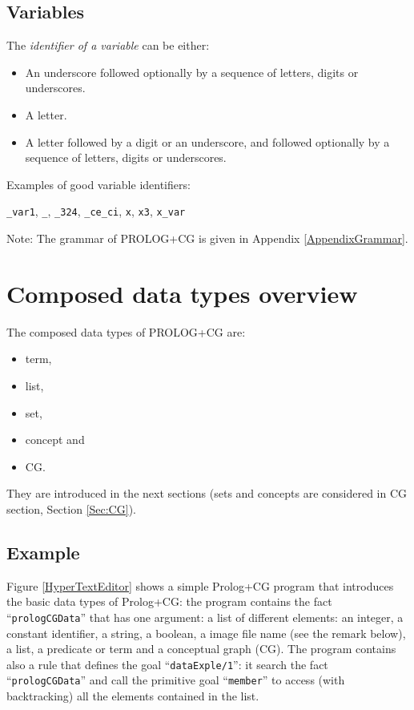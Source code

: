\documentclass{book}
\begin{document}
\subsection{Variables}

The {\it identifier of a variable} can be either:

\begin{itemize}
  \item An underscore followed optionally by a
sequence of letters, digits or underscores.
  \item A letter.
  \item A letter followed by a digit or an
underscore, and followed optionally by a sequence of letters,
digits or underscores.
\end{itemize}

Examples of good variable identifiers:

\texttt{\_var1}, \texttt{\_}, \texttt{\_324}, \texttt{\_ce\_ci},
\texttt{x}, \texttt{x3}, \texttt{x\_var}

Note: The grammar of PROLOG+CG is given in Appendix
\ref{AppendixGrammar}.

\section{Composed data types overview}\label{Sec:ComposedDataTypes}

The composed data types of PROLOG+CG are: 

\begin{itemize}

  \item term, 

  \item list, 

  \item set, 

  \item concept and

  \item CG.

\end{itemize}

They are introduced in the next sections (sets and concepts are
considered in CG section, Section \ref{Sec:CG}).

\subsection{Example}

Figure \ref{HyperTextEditor} shows a simple Prolog+CG program that
introduces the basic data types of Prolog+CG: the program contains the
fact ``\texttt{prologCGData}'' that has one argument: a list of
different elements: an integer, a constant identifier, a string, a
boolean, a image file name (see the remark below), a list, a predicate
or term and a conceptual graph (CG). The program contains also a rule
that defines the goal ``\texttt{dataExple/1}'': it search the fact
``\texttt{prologCGData}'' and call the primitive goal
``\texttt{member}'' to access (with backtracking) all the elements
contained in the list.
\end{document}
